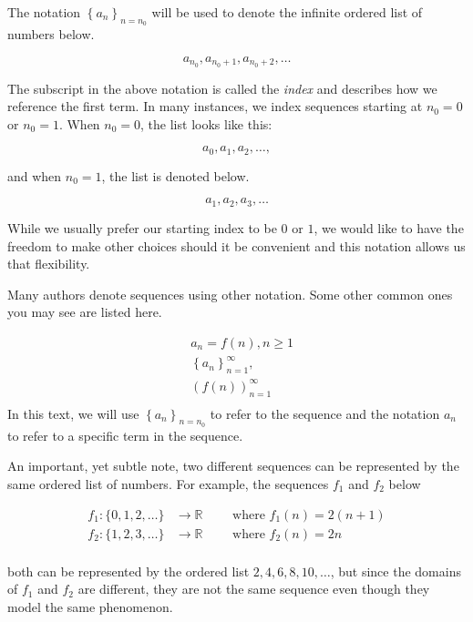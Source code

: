\documentclass{ximera}
\begin{document}
\begin{definition} The notation $\left\{a_n\right\}_{n=n_0}$ will be used to denote the infinite ordered list of numbers below.

\[
a_{n_0}, a_{n_0+1},  a_{n_0+2}, \ldots
\]

\end{definition}

The subscript in the above notation is called the \emph{index} and describes how we reference the first term.  In many instances, we index sequences starting at $n_0=0$ or $n_0=1$.  When $n_0=0$, the list looks like this:

\[
a_0,a_1,a_2, \ldots ,
\]

and when $n_0=1$, the list is denoted below.

\[
a_1,a_2,a_3, \ldots 
\]


While we usually prefer our starting index to be $0$ or $1$, we would like to have the freedom to make other choices should it be convenient and this notation allows us that flexibility.  

\begin{remark}
Many authors denote sequences using other notation.  Some other common ones you may see are listed here. 

\begin{align*}
  &a_n = f(n), n \geq 1   \\
  & \left\{a_n\right\}_{n=1}^\infty, \\
  & \left(f(n)\right)_{n=1}^\infty \\
\end{align*}
In this text, we will use $\left\{a_n\right\}_{n=n_0}$ to refer to the sequence and the notation $a_n$ to refer to a specific term in the sequence.

\end{remark}


An important, yet subtle note, two different sequences can be represented by the same ordered list of numbers.  For example, the sequences $f_1$ and $f_2$ below

\[ \begin{array}{rl}
f_1 : \{0,1,2,\ldots \} & \to \mathbb R \qquad \textrm{ where } f_1(n) =2(n+1) \\
f_2 : \{1,2,3, \ldots \} & \to \mathbb R \qquad \textrm{ where } f_2(n) =2n \\
\end{array}
\]

both can be represented by the ordered list $2, 4, 6, 8, 10, \ldots$, but since the domains of $f_1$ and $f_2$ are different, they are not the same sequence even though they model the same phenomenon. 
\end{document}
